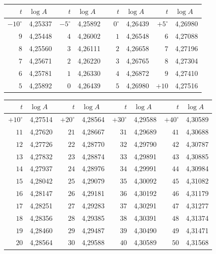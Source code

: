 \documentclass[12pt,a4paper]{article}
\theoremstyle{plain}
\theoremstyle{definition}
\theoremstyle{remark}
\begin{document}
\medskip
\noindent
\begin{tabular}{r|l||r|l||r|l||r|l}
\hline
$t$ & $\log A$ & $t$ & $\log A$ & $t$ & $\log A$ & $t$ & $\log A$ \\
\hline
$-10^{\circ}$ & 4{,}25337 & $-5^{\circ}$ & 4{,}25892 & $0^{\circ}$ & 4{,}26439 & $+5^{\circ}$ & 4{,}26980 \\
$\phantom{-}9$ & 4{,}25448 & $\phantom{-}4$ & 4{,}26002 & $\phantom{-}1$ & 4{,}26548 & $\phantom{-}6$ & 4{,}27088 \\
$\phantom{-}8$ & 4{,}25560 & $\phantom{-}3$ & 4{,}26111 & $\phantom{-}2$ & 4{,}26658 & $\phantom{-}7$ & 4{,}27196 \\
$\phantom{-}7$ & 4{,}25671 & $\phantom{-}2$ & 4{,}26220 & $\phantom{-}3$ & 4{,}26765 & $\phantom{-}8$ & 4{,}27304 \\
$\phantom{-}6$ & 4{,}25781 & $\phantom{-}1$ & 4{,}26330 & $\phantom{-}4$ & 4{,}26872 & $\phantom{-}9$ & 4{,}27410 \\
$\phantom{-}5$ & 4{,}25892 & $\phantom{-}0$ & 4{,}26439 & $\phantom{-}5$ & 4{,}26980 & $+10$ & 4{,}27516 \\
\hline
\end{tabular}

\medskip
\noindent
\begin{tabular}{r|l||r|l||r|l||r|l}
\hline
$t$ & $\log A$ & $t$ & $\log A$ & $t$ & $\log A$ & $t$ & $\log A$ \\
\hline
$+10^{\circ}$ & 4{,}27514 & $+20^{\circ}$ & 4{,}28564 & $+30^{\circ}$ & 4{,}29588 & $+40^{\circ}$ & 4{,}30589 \\
$\phantom{+}11$ & 4{,}27620 & $\phantom{+}21$ & 4{,}28667 & $\phantom{+}31$ & 4{,}29689 & $\phantom{+}41$ & 4{,}30688 \\
$\phantom{+}12$ & 4{,}27726 & $\phantom{+}22$ & 4{,}28770 & $\phantom{+}32$ & 4{,}29790 & $\phantom{+}42$ & 4{,}30787 \\
$\phantom{+}13$ & 4{,}27832 & $\phantom{+}23$ & 4{,}28874 & $\phantom{+}33$ & 4{,}29891 & $\phantom{+}43$ & 4{,}30885 \\
$\phantom{+}14$ & 4{,}27937 & $\phantom{+}24$ & 4{,}28976 & $\phantom{+}34$ & 4{,}29991 & $\phantom{+}44$ & 4{,}30984 \\
$\phantom{+}15$ & 4{,}28042 & $\phantom{+}25$ & 4{,}29079 & $\phantom{+}35$ & 4{,}30092 & $\phantom{+}45$ & 4{,}31082 \\
$\phantom{+}16$ & 4{,}28147 & $\phantom{+}26$ & 4{,}29181 & $\phantom{+}36$ & 4{,}30192 & $\phantom{+}46$ & 4{,}31179 \\
$\phantom{+}17$ & 4{,}28251 & $\phantom{+}27$ & 4{,}29283 & $\phantom{+}37$ & 4{,}30291 & $\phantom{+}47$ & 4{,}31277 \\
$\phantom{+}18$ & 4{,}28356 & $\phantom{+}28$ & 4{,}29385 & $\phantom{+}38$ & 4{,}30391 & $\phantom{+}48$ & 4{,}31374 \\
$\phantom{+}19$ & 4{,}28460 & $\phantom{+}29$ & 4{,}29487 & $\phantom{+}39$ & 4{,}30490 & $\phantom{+}49$ & 4{,}31471 \\
$\phantom{+}20$ & 4{,}28564 & $\phantom{+}30$ & 4{,}29588 & $\phantom{+}40$ & 4{,}30589 & $\phantom{+}50$ & 4{,}31568 \\
\hline
\end{tabular}
\end{document}
